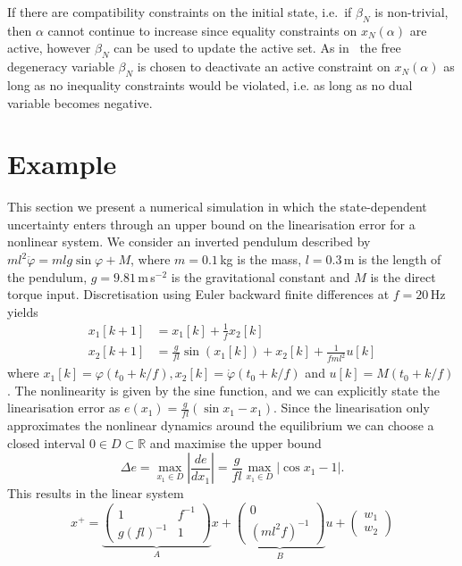 \documentclass{ifacconf}
\providecommand{\abs}[1]{\left|#1\right|}
\begin{document}
If there are compatibility constraints on the initial state, i.e.\ if $\beta_N$ is non-trivial, then $\alpha$ cannot continue 
to  increase since equality constraints on $x_N(\alpha)$ are active, however $\beta_N$ can be used to update the active set. 
As in~\cite{Buerger:ACC} the free degeneracy variable $\beta_N$ is chosen to deactivate an active constraint on $x_N(\alpha)$ 
as long as no inequality constraints would be violated, i.e. as long as no dual variable becomes negative. 

\section{Example}\label{sec:example}
This section we present a numerical simulation in which the state-dependent uncertainty enters through an upper bound on the linearisation
error for a nonlinear system. We consider an inverted pendulum described by $ml^2\ddot\varphi = mlg\sin\varphi+M$, where
$m=0.1$\,kg is the mass, $l=0.3$\,m is the length of the pendulum, $g=9.81$\,m\,s$\mbox{}^{-2}$ is the gravitational
constant and $M$ is the direct torque input. Discretisation using Euler backward finite differences 
at $f = 20$\,Hz yields
\begin{equation}
  \begin{split}
    x_1[k+1] &= x_1[k] + \frac{1}{f} x_2[k]\\
    x_2[k+1] &= \frac{g}{fl} \sin(x_1[k]) + x_2[k] + \frac{1}{fml^2}u[k]
  \end{split}
\end{equation}
where $x_1[k] = \varphi(t_0+k/f),x_2[k] = \dot\varphi(t_0+k/f)$ and $u[k] = M(t_0+k/f)$.
The nonlinearity is given by the sine function, and we can explicitly state the 
linearisation error as $e(x_1)=\frac{g}{fl}(\sin x_1 - x_1)$. Since the linearisation
only approximates the nonlinear dynamics around the equilibrium we can choose a closed interval 
$0\in D\subset\mathbb R$ and maximise the upper bound 
\begin{equation}
  \Delta e = \max_{x_1\in D}\abs{\frac{de}{dx_1}} = \frac{g}{fl}\max_{x_1\in D}\abs{\cos x_1-1}.
\end{equation}
This results in the linear system
\begin{equation}
  x^+ = \underbrace{\left(\begin{array}{cc}
  1 & f^{-1}\\ g(fl)^{-1} & 1
  \end{array}\right)}_A x + \underbrace{\left(\begin{array}{c} 0 \\(ml^2f)^{-1} \end{array}\right)}_B u
  +\left(\begin{array}{c}w_1\\ w_2\end{array}\right)
\end{equation}
\end{document}

